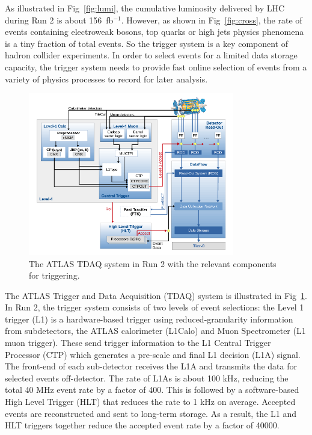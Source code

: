 \par As illustrated in Fig~\ref{fig:lumi}, the cumulative luminosity delivered by LHC during Run 2 is about 156~fb$^{-1}$. However, as shown in Fig~\ref{fig:cross}, the rate of events containing electroweak bosons, top quarks or high \pt jets physics phenomena is a tiny fraction of total events. So the trigger system is a key component of hadron collider experiments. In order to select events for a limited data storage capacity, the trigger system needs to provide fast online selection of events from a variety of physics processes to record for later analysis.

\begin{figure}[htbp!]
    \centering
    \includegraphics[width=0.8\textwidth]{chapters/c4/figures/TDAQ}
    \caption{The ATLAS TDAQ system in Run 2 with the relevant components for triggering.}
    \label{fig:TDAQ}
\end{figure}

\par The ATLAS Trigger and Data Acquisition (TDAQ) system \cite{Ruiz-Martinez:2133909} is illustrated in Fig~\ref{fig:TDAQ}. In Run 2, the trigger system consists of two levels of event selections: the Level 1 trigger (L1) is a hardware-based trigger using reduced-granularity information from subdetectors, the ATLAS calorimeter (L1Calo) and Muon Spectrometer (L1 muon trigger). These send trigger information to the L1 Central Trigger Processor (CTP) which generates a pre-scale and final L1 decision (L1A) signal. The front-end of each sub-detector receives the L1A and transmits the data for selected events off-detector. The rate of L1As is about 100 kHz, reducing the total 40 MHz event rate by a factor of 400. This is followed by a software-based High Level Trigger (HLT) that reduces the rate to 1 kHz on average. Accepted events are reconstructed and sent to long-term storage. As a result, the L1 and HLT triggers together reduce the accepted event rate by a factor of 40000.
